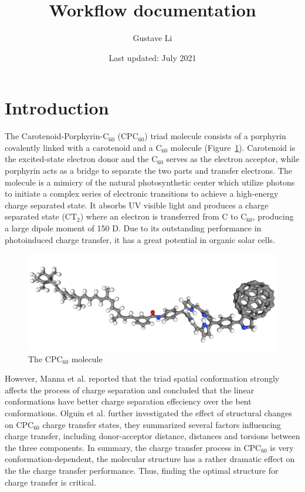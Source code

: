 \documentclass[a4paper]{article}
\title{Workflow documentation}
\author{Gustave Li}
\date{Last updated: July 2021}
\begin{document}
\maketitle

\section{Introduction}
The Carotenoid-Porphyrin-\(\text{C}_{60}\) (\(\text{CPC}_{60}\)) triad molecule consists of a porphyrin covalently linked with a carotenoid and a \(\text{C}_{60}\) molecule (Figure~\ref{fig:CPC60}). Carotenoid is the excited-state electron donor and the \(\text{C}_{60}\) serves as the electron acceptor, while porphyrin acts as a bridge to separate the two parts and transfer electrons. The molecule is a mimicry of the natural photosynthetic center which utilize photons to initiate a complex series of electronic transitions to achieve a high-energy charge separated state. It absorbs UV visible light and produces a charge separated state (\(\text{CT}_{2}\)) where an electron is transferred from C to \(\text{C}_{60}\), producing a large dipole moment of 150 D. Due to its outstanding performance in photoinduced charge transfer, it has a great potential in organic solar cells.

\begin{figure}[H]
    \centering
    \includegraphics[width=0.75\linewidth]{projects/Gustave_Li/Docs/Triad.png}
    \caption{The \(\text{CPC}_{60}\) molecule}
    \label{fig:CPC60}
\end{figure}

However, Manna et al. reported that the triad spatial conformation strongly affects the process of charge separation and concluded that the linear conformations have better charge separation effeciency over the bent conformations. Olguin et al. further investigated the effect of structural changes on \(\text{CPC}_{60}\) charge transfer states, they summarized several factors influencing charge transfer, including donor-acceptor distance, distances and torsions between the three components. In summary, the charge transfer process in \(\text{CPC}_{60}\) is very conformation-dependent,  the molecular structure has a rather dramatic effect on the the charge transfer performance. Thus, finding the optimal structure for charge transfer is critical.
\end{document}
